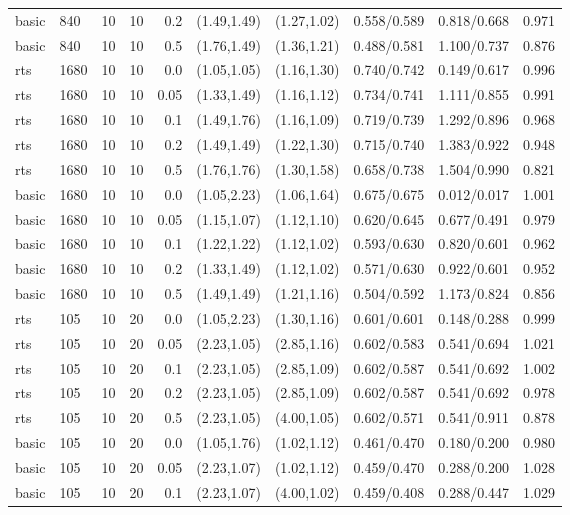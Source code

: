 \begin{tabular}{llrrrccccc}
basic & 840 & 10 & 10 & 0.2 & (1.49,1.49) & (1.27,1.02) & 0.558/0.589 & 0.818/0.668 & 0.971 \\
basic & 840 & 10 & 10 & 0.5 & (1.76,1.49) & (1.36,1.21) & 0.488/0.581 & 1.100/0.737 & 0.876 \\
rts & 1680 & 10 & 10 & 0.0 & (1.05,1.05) & (1.16,1.30) & 0.740/0.742 & 0.149/0.617 & 0.996 \\
rts & 1680 & 10 & 10 & 0.05 & (1.33,1.49) & (1.16,1.12) & 0.734/0.741 & 1.111/0.855 & 0.991 \\
rts & 1680 & 10 & 10 & 0.1 & (1.49,1.76) & (1.16,1.09) & 0.719/0.739 & 1.292/0.896 & 0.968 \\
rts & 1680 & 10 & 10 & 0.2 & (1.49,1.49) & (1.22,1.30) & 0.715/0.740 & 1.383/0.922 & 0.948 \\
rts & 1680 & 10 & 10 & 0.5 & (1.76,1.76) & (1.30,1.58) & 0.658/0.738 & 1.504/0.990 & 0.821 \\
basic & 1680 & 10 & 10 & 0.0 & (1.05,2.23) & (1.06,1.64) & 0.675/0.675 & 0.012/0.017 & 1.001 \\
basic & 1680 & 10 & 10 & 0.05 & (1.15,1.07) & (1.12,1.10) & 0.620/0.645 & 0.677/0.491 & 0.979 \\
basic & 1680 & 10 & 10 & 0.1 & (1.22,1.22) & (1.12,1.02) & 0.593/0.630 & 0.820/0.601 & 0.962 \\
basic & 1680 & 10 & 10 & 0.2 & (1.33,1.49) & (1.12,1.02) & 0.571/0.630 & 0.922/0.601 & 0.952 \\
basic & 1680 & 10 & 10 & 0.5 & (1.49,1.49) & (1.21,1.16) & 0.504/0.592 & 1.173/0.824 & 0.856 \\
rts & 105 & 10 & 20 & 0.0 & (1.05,2.23) & (1.30,1.16) & 0.601/0.601 & 0.148/0.288 & 0.999 \\
rts & 105 & 10 & 20 & 0.05 & (2.23,1.05) & (2.85,1.16) & 0.602/0.583 & 0.541/0.694 & 1.021 \\
rts & 105 & 10 & 20 & 0.1 & (2.23,1.05) & (2.85,1.09) & 0.602/0.587 & 0.541/0.692 & 1.002 \\
rts & 105 & 10 & 20 & 0.2 & (2.23,1.05) & (2.85,1.09) & 0.602/0.587 & 0.541/0.692 & 0.978 \\
rts & 105 & 10 & 20 & 0.5 & (2.23,1.05) & (4.00,1.05) & 0.602/0.571 & 0.541/0.911 & 0.878 \\
basic & 105 & 10 & 20 & 0.0 & (1.05,1.76) & (1.02,1.12) & 0.461/0.470 & 0.180/0.200 & 0.980 \\
basic & 105 & 10 & 20 & 0.05 & (2.23,1.07) & (1.02,1.12) & 0.459/0.470 & 0.288/0.200 & 1.028 \\
basic & 105 & 10 & 20 & 0.1 & (2.23,1.07) & (4.00,1.02) & 0.459/0.408 & 0.288/0.447 & 1.029 \\

\end{tabular}

